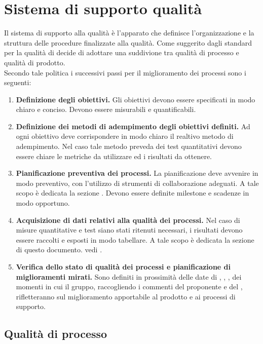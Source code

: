 \documentclass[12pt,a4paper]{article}
\begin{document}
\section{Sistema di supporto qualità}
Il sistema di supporto alla qualità è l'apparato che definisce l'organizzazione e la struttura delle procedure finalizzate alla qualità. Come suggerito dagli standard per la qualità di decide di adottare una suddivione tra qualità di processo e qualità di prodotto. \\
Secondo tale politica i successivi passi per il miglioramento dei processi sono i seguenti: 

\begin{enumerate}
	\item \textbf {Definizione degli obiettivi.} Gli obiettivi devono essere specificati in modo chiaro e conciso. Devono essere misurabili e quantificabili.
	\item \textbf{Definizione dei metodi di adempimento degli obiettivi definiti.} Ad ogni obiettivo deve corrispondere in modo chiaro il realtivo metodo di adempimento. Nel caso tale metodo preveda dei test quantitativi devono essere chiare le metriche da utilizzare ed i risultati da ottenere.
	\item \textbf{Pianificazione preventiva dei processi.} La pianificazione deve avvenire in modo preventivo, con l'utilizzo di strumenti di collaborazione adeguati. A tale scopo è dedicata la sezione \NdP. Devono essere definite milestone e scadenze in modo opportuno.  
	\item \textbf{Acquisizione di dati relativi alla qualità dei processi.} Nel caso di misure quantitative e test siano stati ritenuti necessari, i risultati devono essere raccolti e esposti in modo tabellare. A tale scopo è dedicata la sezione di questo documento. vedi \PdQ.
	
	\item \textbf{Verifica dello stato di qualità dei processi e pianificazione di miglioramenti mirati.}
	Sono definiti in prossimità delle date di \RR, \RA, \RP, \RQ dei momenti in cui il gruppo, raccogliendo i commenti del proponente \Zucchetti e del \Vardanega, rifletteranno sul miglioramento apportabile al prodotto e ai processi di supporto.
	
\end{enumerate}

\subsection{Qualità di processo}
\end{document}
